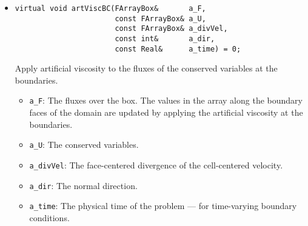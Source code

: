 \begin{itemize}
\item \begin{small}\begin{verbatim}
virtual void artViscBC(FArrayBox&       a_F,
                       const FArrayBox& a_U,
                       const FArrayBox& a_divVel,
                       const int&       a_dir,
                       const Real&      a_time) = 0;
\end{verbatim}\end{small}
Apply artificial viscosity to the fluxes of the conserved variables at the
boundaries.
\begin{itemize}
\item \verb/a_F/:  The fluxes over the box.  The values in the array
along the boundary faces of the domain are updated by applying the 
artificial viscosity at the boundaries.
\vspace{-0.07in}
\item \verb/a_U/:  The conserved variables.
\vspace{-0.07in}
\item \verb/a_divVel/:  The face-centered divergence of the cell-centered velocity. 
\vspace{-0.07in}
\item \verb/a_dir/:  The normal direction.
\vspace{-0.07in}
\item \verb/a_time/:  The physical time of the problem --- for time-varying
boundary conditions.
\end{itemize}

\end{itemize}
